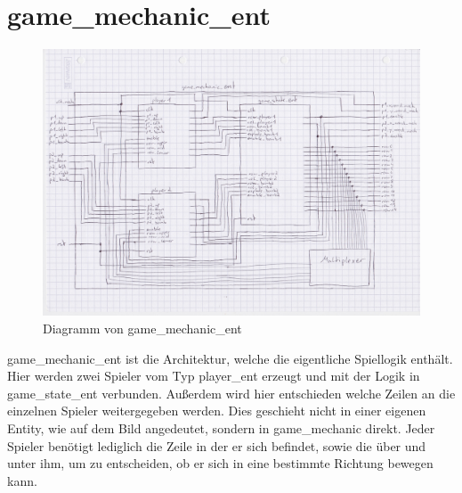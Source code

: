 \documentclass[parskip=full]{scrartcl}
\begin{document}
		\section{game\_mechanic\_ent}
			\begin{figure}[H]
				\centering
				\includegraphics[scale=0.1]{./bilder/gameMechanic.jpeg}
				\caption{Diagramm von game\_mechanic\_ent}
			\end{figure}
			game\_mechanic\_ent ist die Architektur, welche die eigentliche Spiellogik enthält. Hier werden zwei Spieler vom Typ player\_ent erzeugt und mit der Logik in game\_state\_ent verbunden. Außerdem wird hier entschieden welche Zeilen an die einzelnen Spieler weitergegeben werden. Dies geschieht nicht in einer eigenen Entity, wie auf dem Bild angedeutet, sondern in game\_mechanic direkt. Jeder Spieler benötigt lediglich die Zeile in der er sich befindet, sowie die über und unter ihm, um zu entscheiden, ob er sich in eine bestimmte Richtung bewegen kann. 
		
\end{document}
